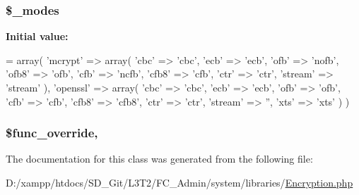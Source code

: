 \subsubsection[{\$\+\_\+modes}]{\setlength{\rightskip}{0pt plus 5cm}\$\+\_\+modes\hspace{0.3cm}{\ttfamily [protected]}}\label{class_c_i___encryption_abb65eeb1f25e268d87c4736add738492}
{\bfseries Initial value\+:}
\begin{DoxyCode}
= array(
        \textcolor{stringliteral}{'mcrypt'} => array(
            \textcolor{stringliteral}{'cbc'} => \textcolor{stringliteral}{'cbc'},
            \textcolor{stringliteral}{'ecb'} => \textcolor{stringliteral}{'ecb'},
            \textcolor{stringliteral}{'ofb'} => \textcolor{stringliteral}{'nofb'},
            \textcolor{stringliteral}{'ofb8'} => \textcolor{stringliteral}{'ofb'},
            \textcolor{stringliteral}{'cfb'} => \textcolor{stringliteral}{'ncfb'},
            \textcolor{stringliteral}{'cfb8'} => \textcolor{stringliteral}{'cfb'},
            \textcolor{stringliteral}{'ctr'} => \textcolor{stringliteral}{'ctr'},
            \textcolor{stringliteral}{'stream'} => \textcolor{stringliteral}{'stream'}
        ),
        \textcolor{stringliteral}{'openssl'} => array(
            \textcolor{stringliteral}{'cbc'} => \textcolor{stringliteral}{'cbc'},
            \textcolor{stringliteral}{'ecb'} => \textcolor{stringliteral}{'ecb'},
            \textcolor{stringliteral}{'ofb'} => \textcolor{stringliteral}{'ofb'},
            \textcolor{stringliteral}{'cfb'} => \textcolor{stringliteral}{'cfb'},
            \textcolor{stringliteral}{'cfb8'} => \textcolor{stringliteral}{'cfb8'},
            \textcolor{stringliteral}{'ctr'} => \textcolor{stringliteral}{'ctr'},
            \textcolor{stringliteral}{'stream'} => \textcolor{stringliteral}{''},
            \textcolor{stringliteral}{'xts'} => \textcolor{stringliteral}{'xts'}
        )
    )
\end{DoxyCode}
\hypertarget{class_c_i___encryption_a9f90fea779d0ce933f0adf8475920312}{}
\subsubsection[{\$func\+\_\+override}]{\setlength{\rightskip}{0pt plus 5cm}\$func\+\_\+override\hspace{0.3cm}{\ttfamily [static]}, {\ttfamily [protected]}}\label{class_c_i___encryption_a9f90fea779d0ce933f0adf8475920312}


The documentation for this class was generated from the following file\+:\begin{DoxyCompactItemize}
\item 
D\+:/xampp/htdocs/\+S\+D\+\_\+\+Git/\+L3\+T2/\+F\+C\+\_\+\+Admin/system/libraries/\hyperlink{system_2libraries_2_encryption_8php}{Encryption.\+php}\end{DoxyCompactItemize}
